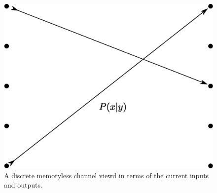 \begin{figure}[h]
    \centering
    \includegraphics[scale=0.3]{Figures/Chapter2/dmc_2.eps}
    \caption{A discrete memoryless channel viewd in terms of the current inputs
    and outputs.}
    \label{fig_2.3}
\end{figure}

